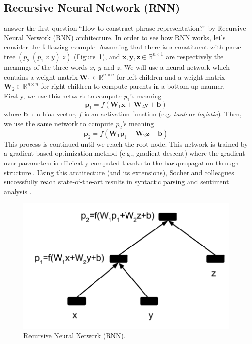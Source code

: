 \documentclass[11pt]{article}
\begin{document}
\subsection{Recursive Neural Network (RNN)}
\label{subsection rnn}
 answer the first question ``How to construct phrase representation?'' 
by Recursive Neural Network (RNN) architecture. 
In order to see how RNN works, 
let's consider the following example. Assuming that there is a constituent with parse
tree $(p_2 \; (p_1 \; x \; y) \; z)$ (Figure~\ref{figure rnn}), and $\mathbf{x},\mathbf{y},\mathbf{z} \in \mathbb{R}^{n \times 1}$
are respectively the meanings of the three words $x$, $y$ and $z$. 
We will use a neural network 
which contains a weight matrix $\mathbf{W}_1  \in \mathbb{R}^{n \times n}$ for left children and 
a weight matrix $\mathbf{W}_2  \in \mathbb{R}^{n \times n}$ for right children 
to compute parents in a bottom up manner. Firstly, we use this network 
to compute $p_1$'s meaning
\begin{equation}
	\mathbf{p}_1 = f(\mathbf{W}_1 \mathbf{x} + \mathbf{W}_2 \mathbf{y} + \mathbf{b})
\end{equation}
where $\mathbf{b}$ is a bias vector, $f$ is an activation function (e.g. \textit{tanh} or \textit{logistic}).
Then, we use the same network to compute $p_2$'s meaning
\begin{equation}
	\mathbf{p}_2 = f(\mathbf{W}_1 \mathbf{p}_1 + \mathbf{W}_2 \mathbf{z} + \mathbf{b})
\end{equation}
This process is continued until we reach the root node.  This network is trained by 
a gradient-based optimization method (e.g., gradient descent) where the gradient 
over parameters is efficiently computed thanks to the backpropagation through structure
\cite{goller_learning_1996}. Using this architecture 
(and its extensions), Socher and colleagues successfully reach 
state-of-the-art results in syntactic parsing \cite{socher2013parsing} and 
sentiment analysis \cite{socher2013recursive}. 
\begin{figure}[h!]
	\center
	\includegraphics[scale=0.5]{RNN.png}
	\caption{Recursive Neural Network (RNN).}
	\label{figure rnn}
\end{figure}
\end{document}
